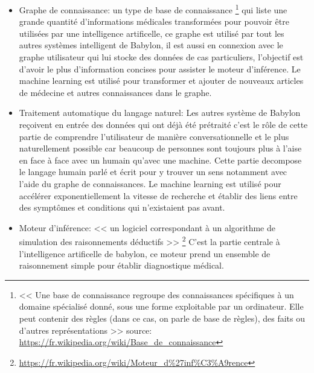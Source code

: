             \begin{itemize}
                \item Graphe de connaissance: un type de base de connaissance
                    \footnote{
                        << Une base de connaissance regroupe des connaissances spécifiques à un 
                        domaine spécialisé donné, sous une forme exploitable par un ordinateur. 
                        Elle peut contenir des règles (dans ce cas, on parle de base de règles), 
                        des faits ou d'autres représentations >> \newline 
                        source: \url{https://fr.wikipedia.org/wiki/Base_de_connaissance}
                    }
                    qui liste une grande quantité d'informations médicales transformées 
                    pour pouvoir être utilisées par une intelligence artificelle, 
                    ce graphe est utilisé par tout les autres systèmes intelligent 
                    de Babylon, il est aussi en connexion avec le graphe utilisateur 
                    qui lui stocke des données de cas particuliers,
                    l'objectif est d'avoir le plus d'information concises 
                    pour assister le moteur d'inférence. 
                    Le machine learning est utilisé pour transformer et ajouter de nouveaux articles 
                    de médecine et autres connaissances dans le graphe.
                    \newline

                \item Traitement automatique du langage naturel: 
                Les autres système de Babylon reçoivent en entrée des données qui ont déjà 
                été prétraité c'est le rôle de cette partie de comprendre l'utilisateur 
                de manière conversationnelle et le plus naturellement possible car
                beaucoup de personnes sont toujours plus à l'aise en face à face 
                avec un humain qu'avec une machine. Cette partie decompose 
                le langage humain parlé et écrit pour y trouver un sens notamment avec l'aide 
                du graphe de connaissances. Le machine learning est utilisé pour accélérer exponentiellement 
                la vitesse de recherche et établir des liens entre des symptômes et conditions 
                qui n'existaient pas avant.
                \newline

                \item Moteur d'inférence: 
                << un logiciel correspondant à un algorithme de simulation des raisonnements déductifs >>
                \footnote{\url{https://fr.wikipedia.org/wiki/Moteur_d\%27inf\%C3\%A9rence}}
                C'est la partie centrale à l'intelligence artificelle de babylon, ce moteur 
                prend un ensemble de raisonnement simple pour établir diagnostique médical.
                \newline
            \end{itemize} 
            \newpage


